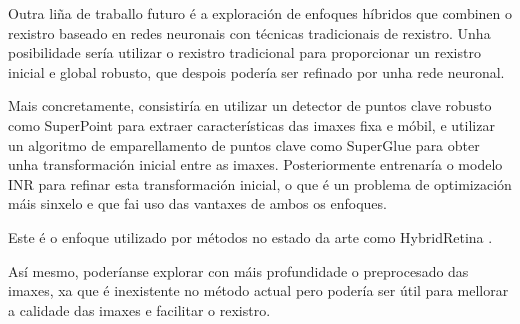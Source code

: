 Outra liña de traballo futuro é a exploración de enfoques híbridos que combinen o rexistro baseado en redes neuronais con técnicas tradicionais de rexistro.
Unha posibilidade sería utilizar o rexistro tradicional para proporcionar un rexistro inicial e global robusto, que despois podería ser refinado por unha rede neuronal.

Mais concretamente, consistiría en utilizar un detector de puntos clave robusto como SuperPoint \cite{superpoint} para extraer características das imaxes fixa e móbil, e utilizar un algoritmo de emparellamento de puntos clave como SuperGlue \cite{superglue} para obter unha transformación inicial entre as imaxes.
Posteriormente entrenaría o modelo INR para refinar esta transformación inicial, o que é un problema de optimización máis sinxelo e que fai uso das vantaxes de ambos os enfoques.

Este é o enfoque utilizado por métodos no estado da arte como HybridRetina \cite{liu2024progressiveretinalimageregistration}. 

Así mesmo, poderíanse explorar con máis profundidade o preprocesado das imaxes, xa que é inexistente no método actual pero podería ser útil para mellorar a calidade das imaxes e facilitar o rexistro.